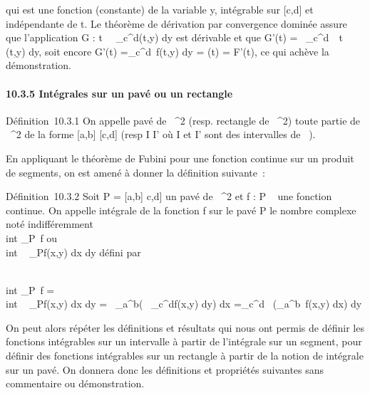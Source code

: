 \documentclass[]{article}
\begin{document}
qui est une fonction (constante) de la variable y, intégrable sur
{[}c,d{]} et indépendante de t. Le théorème de dérivation par
convergence dominée assure que l'application G :
t\mapsto~\int ~
\_c^d\psi(t,y) dy est dérivable et que G'(t)
=\int ~
\_c^d\partial~\psi\over \partial~t (t,y) dy, soit encore
G'(t) =\int  \_c^d~f(t,y) dy = \phi(t)
= F'(t), ce qui achève la démonstration.

\paragraph{10.3.5 Intégrales sur un pavé ou un rectangle}

Définition~10.3.1 On appelle pavé de ~^2 (resp. rectangle de
~^2) toute partie de ~^2 de la forme {[}a,b{]} \times
{[}c,d{]} (resp I \times I' où I et I' sont des intervalles de ~).

En appliquant le théorème de Fubini pour une fonction continue sur un
produit de segments, on est amené à donner la définition suivante~:

Définition~10.3.2 Soit P = {[}a,b{]} \times {[}c,d{]} un pavé de
~^2 et f : P \rightarrow~  une fonction continue. On appelle intégrale
de la fonction f sur le pavé P le nombre complexe noté indifféremment
\int  \\int  \_P~f
ou \int  \\int ~
\_Pf(x,y) dx dy défini par

\int  \\int  \_P~f
=\int  \\int ~
\_Pf(x,y) dx dy =\int ~
\_a^b\left (\int ~
\_c^df(x,y) dy\right ) dx
=\int  \_c^d~\left
(\int  \_a^b~f(x,y)
dx\right ) dy

On peut alors répéter les définitions et résultats qui nous ont permis
de définir les fonctions intégrables sur un intervalle à partir de
l'intégrale sur un segment, pour définir des fonctions intégrables sur
un rectangle à partir de la notion de intégrale sur un pavé. On donnera
donc les définitions et propriétés suivantes sans commentaire ou
démonstration.
\end{document}
